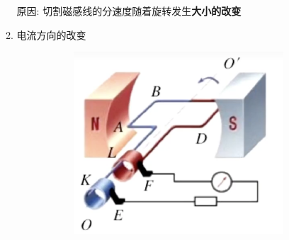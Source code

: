 \documentclass{article}
\begin{document}
\begin{enumerate}
\begin{enumerate}[label=(\arabic*)]
            原因: \quad 切割磁感线的分速度随着旋转发生\textbf{大小的改变}

            \vspace{5em}

            \item 电流方向的改变
            
            \begin{figure}[h] %
                \centering
                
                \begin{subfigure}{0.4\textwidth}
                    \centering
                    \includegraphics[width=\textwidth,keepaspectratio]{pictures/1.1-3.png}
                    \caption{} 
                \end{subfigure}
                \hfill %
                \begin{subfigure}{0.4\textwidth}
                    \centering

\end{subfigure}
\end{figure}
\end{enumerate}
\end{enumerate}
\end{document}
